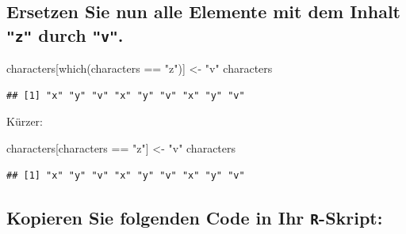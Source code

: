 \documentclass[12pt,a4paper]{article}
\newenvironment{Shaded}{\begin{snugshade}}{\end{snugshade}}
\newcommand{\FunctionTok}[1]{\textcolor[rgb]{0.00,0.00,0.00}{#1}}
\newcommand{\NormalTok}[1]{#1}
\newcommand{\OtherTok}[1]{\textcolor[rgb]{0.56,0.35,0.01}{#1}}
\newcommand{\SpecialCharTok}[1]{\textcolor[rgb]{0.00,0.00,0.00}{#1}}
\newcommand{\StringTok}[1]{\textcolor[rgb]{0.31,0.60,0.02}{#1}}
\begin{document}
\vspace{0.5cm}

\hypertarget{ersetzen-sie-nun-alle-elemente-mit-dem-inhalt-durch-.}{%
\subsection{\texorpdfstring{Ersetzen Sie nun alle Elemente mit dem
Inhalt \texttt{"z"} durch
\texttt{"v"}.}{Ersetzen Sie nun alle Elemente mit dem Inhalt  durch .}}\label{ersetzen-sie-nun-alle-elemente-mit-dem-inhalt-durch-.}}

\begin{Shaded}
\begin{Highlighting}[]
\NormalTok{    characters[}\FunctionTok{which}\NormalTok{(characters }\SpecialCharTok{==} \StringTok{"z"}\NormalTok{)] }\OtherTok{\textless{}{-}} \StringTok{"v"}
\NormalTok{    characters}
\end{Highlighting}
\end{Shaded}

\begin{verbatim}
## [1] "x" "y" "v" "x" "y" "v" "x" "y" "v"
\end{verbatim}

Kürzer:

\begin{Shaded}
\begin{Highlighting}[]
\NormalTok{    characters[characters }\SpecialCharTok{==} \StringTok{"z"}\NormalTok{] }\OtherTok{\textless{}{-}} \StringTok{"v"}
\NormalTok{    characters}
\end{Highlighting}
\end{Shaded}

\begin{verbatim}
## [1] "x" "y" "v" "x" "y" "v" "x" "y" "v"
\end{verbatim}

\vspace{0.5cm}

\hypertarget{kopieren-sie-folgenden-code-in-ihr--skript}{%
\subsection{\texorpdfstring{Kopieren Sie folgenden Code in Ihr
\texttt{R}-Skript:}{Kopieren Sie folgenden Code in Ihr -Skript:}}\label{kopieren-sie-folgenden-code-in-ihr--skript}}
\end{document}
